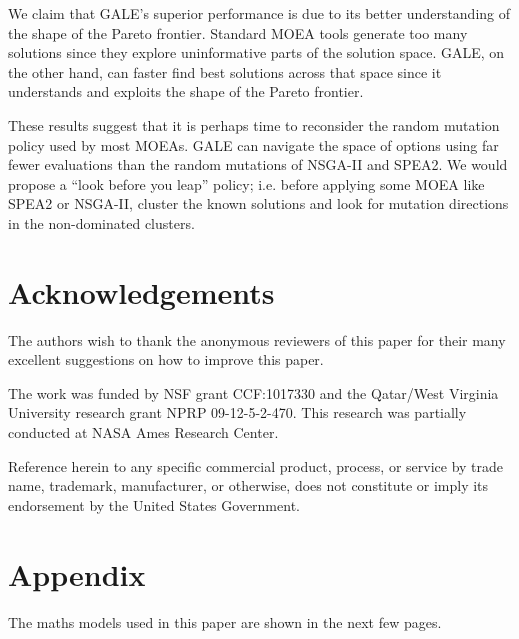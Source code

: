 \documentclass[10pt,journal,compsoc]{IEEEtran}
\newenvironment{changed}{\par\color{MyDarkBlue}}{\par}
\begin{document}
We claim that GALE's superior performance is due to
its better understanding of the shape of the Pareto
frontier.  Standard MOEA tools generate too many
solutions since they explore uninformative parts of
the solution space.  GALE, on the other hand, can
faster find best solutions across that space since
it understands and exploits the shape of the Pareto
frontier.


These results suggest that it is perhaps time to reconsider the random
mutation policy used by most MOEAs.  GALE can navigate the space of
options using far fewer evaluations than the random mutations of
NSGA-II and SPEA2. We would propose a ``look before you leap'' policy;
i.e. before applying some MOEA like SPEA2 or NSGA-II, cluster the
known solutions and look for mutation directions in the non-dominated
clusters.

   


\section*{Acknowledgements}
\begin{changed}
The authors wish to thank the anonymous reviewers of this
paper for their many excellent suggestions on how to improve this paper.
\end{changed}
The work was funded by NSF grant CCF:1017330 and the
Qatar/West Virginia University research grant NPRP
09-12-5-2-470.  This research was partially
conducted at NASA Ames Research Center. 

Reference
herein to any specific commercial product, process,
or service by trade name, trademark, manufacturer,
or otherwise, does not constitute or imply its endorsement by the United States Government.


    

\section*{Appendix}
The maths models used in this paper are shown in the next few pages.
\color{black}
\end{document}
